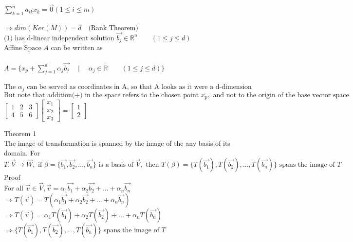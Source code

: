 \documentclass[10pt]{article}
\begin{document}
$\sum_{k=1}^{n} a_{i k} x_{k} = \vec{0} (1 \leq i \leq m)$\\\\
$\Rightarrow dim(Ker(M)) = d \quad \text{(Rank Theorem)}$\\
$\text{(1) has d-linear independent solution } \vec{b_{j}} \in \mathbb{R}^{n} \quad\quad (1 \leq j \leq d)$\\
$\text{Affine Space }\mathit{A}$ can be written as\\\\ 
$A = \Big\{ x_{p} + \sum_{j=1}^{d}\alpha_{j}\vec{b_{j}} \quad \mid \quad \alpha_{j} \in \mathbb{R} \quad\quad (1 \leq j \leq d)\Big\} $\\\\
$\text{The } \alpha_{j} \text{ can be served as coordinates in A, so that A looks as it were a d-dimension coordiate space.}$\\ 
$\text{But note that addition(+) in the space refers to the chosen point } x_{p}, \text{ and not to the origin of the base vector space}$\\

$
        \begin{bmatrix}
        1 & 2 & 3 \\
        4 & 5 & 6    
        \end{bmatrix}
        \left[
        \begin{array}{c}
        x_1 \\
        x_2 \\
        x_3 
        \end{array}
        \right] = 
        \left[ 
        \begin{array}{c}
        1 \\ 
        2 
        \end{array}
        \right]
$
\newpage

\noindent
Theorem 1\\
The image of transformation is spanned by the image of the any basis of its domain. For $T:\vec{V} \rightarrow \vec{W}, \text{ if } \beta=\{ \vec{b_1},\vec{b_2},...,\vec{b_n} \} \text{ is a basis of }\vec{V}, 
\text{ then }T(\beta) = \{ T(\vec{b_1}), T(\vec{b_2}), ... ,T(\vec{b_n})\} \text{ spans the image of }T$\\

\noindent
Proof\\
For all $\vec{v} \in \vec{V}, \vec{v} = \alpha_1\vec{b_1} + \alpha_2\vec{b_2} + ... + \alpha_n\vec{b_n}$\\
$\Rightarrow T(\vec{v}) = T(\alpha_1\vec{b_1} + \alpha_2\vec{b_2} + ... + \alpha_n\vec{b_n})$\\
$\Rightarrow T(\vec{v}) = \alpha_1 T(\vec{b_1}) + \alpha_2 T(\vec{b_2}) + ... + \alpha_n T(\vec{b_n})$\\
$\Rightarrow \{ T(\vec{b_1}), T(\vec{b_2}),...,T(\vec{b_n})\} \text{ spans the image of }T$\\
\end{document}
